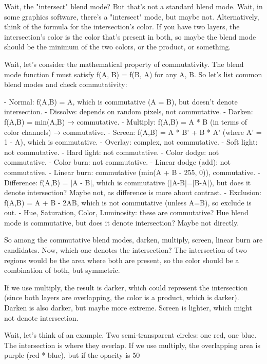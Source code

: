 Wait, the "intersect" blend mode? But that's not a standard blend mode. Wait, in some graphics software, there's a "intersect" mode, but maybe not. Alternatively, think of the formula for the intersection's color. If you have two layers, the intersection's color is the color that's present in both, so maybe the blend mode should be the minimum of the two colors, or the product, or something. 

Wait, let's consider the mathematical property of commutativity. The blend mode function f must satisfy f(A, B) = f(B, A) for any A, B. So let's list common blend modes and check commutativity:

- Normal: f(A,B) = A, which is commutative (A = B), but doesn't denote intersection.
- Dissolve: depends on random pixels, not commutative.
- Darken: f(A,B) = min(A,B) → commutative.
- Multiply: f(A,B) = A * B (in terms of color channels) → commutative.
- Screen: f(A,B) = A * B' + B * A' (where A' = 1 - A), which is commutative.
- Overlay: complex, not commutative.
- Soft light: not commutative.
- Hard light: not commutative.
- Color dodge: not commutative.
- Color burn: not commutative.
- Linear dodge (add): not commutative.
- Linear burn: commutative (min(A + B - 255, 0)), commutative.
- Difference: f(A,B) = |A - B|, which is commutative (|A-B|=|B-A|), but does it denote intersection? Maybe not, as difference is more about contrast.
- Exclusion: f(A,B) = A + B - 2AB, which is not commutative (unless A=B), so exclude is out.
- Hue, Saturation, Color, Luminosity: these are commutative? Hue blend mode is commutative, but does it denote intersection? Maybe not directly.

So among the commutative blend modes, darken, multiply, screen, linear burn are candidates. Now, which one denotes the intersection? The intersection of two regions would be the area where both are present, so the color should be a combination of both, but symmetric. 

If we use multiply, the result is darker, which could represent the intersection (since both layers are overlapping, the color is a product, which is darker). Darken is also darker, but maybe more extreme. Screen is lighter, which might not denote intersection. 

Wait, let's think of an example. Two semi-transparent circles: one red, one blue. The intersection is where they overlap. If we use multiply, the overlapping area is purple (red * blue), but if the opacity is 50%

